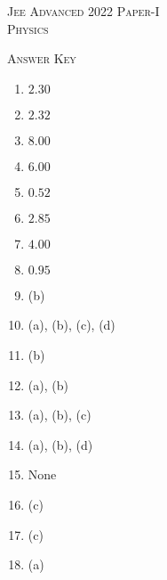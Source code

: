 \pagebreak

\begin{center}
    \textsc{Jee Advanced 2022 Paper-I\\Physics}
\end{center}

\begin{center}
    \textsc{Answer Key}
\end{center}

\begin{multicols}{4}
\begin{enumerate}
    \item $2.30$
    \item $2.32$
    \item $8.00$
    \item $6.00$
    \item $0.52$
    \item $2.85$
    \item $4.00$
    \item $0.95$
    \item (b)
    \item (a), (b), (c), (d)
    \item (b)
    \item (a), (b)
    \item (a), (b), (c)
    \item (a), (b), (d)
    \item None
    \item (c)
    \item (c)
    \item (a)
\end{enumerate}
\end{multicols}